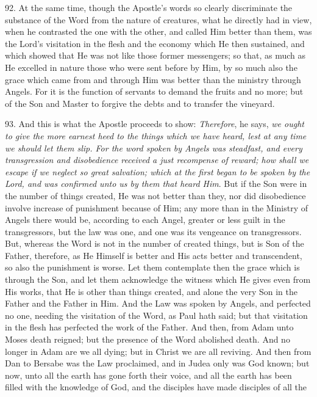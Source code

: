 92. At the same time, though
the Apostle's words so clearly discriminate the substance of the Word
from the nature of creatures, what he directly had in view, when he
contrasted the one with the other, and called Him better than them,
was the Lord's visitation in the flesh and the economy which He then
sustained, and which showed that He was not like those former
messengers; so that, as much as He excelled in nature those who were
sent before by Him, by so much also the grace which came from and
through Him was better than the ministry through Angels. For it is the
function of servants to demand the fruits and no more; but of the Son
and Master to forgive the debts and to transfer the vineyard.

93. And this is what the
Apostle proceeds to show: \emph{Therefore}, he says, \emph{we ought to
give the more earnest heed to the things which we have heard, lest at
any time we should let them slip. For the word spoken by Angels was
steadfast, and every transgression and disobedience received a just
recompense} \emph{of reward; how shall we escape if we neglect
so great salvation; which at the first began to be spoken by the Lord,
and was confirmed unto us by them that heard Him}. But if the Son
were in the number of things created, He was not better than they, nor
did disobedience involve increase of punishment because of Him; any
more than in the Ministry of Angels there would be, according to each
Angel, greater or less guilt in the transgressors, but the law was
one, and one was its vengeance on transgressors. But, whereas the Word
is not in the number of created things, but is Son of the Father,
therefore, as He Himself is better and His acts better and
transcendent, so also the punishment is worse. Let them contemplate
then the grace which is through the Son, and let them acknowledge the
witness which He gives even from His works, that He is other than
things created, and alone the very Son in the Father and the Father in
Him. And the Law was spoken by Angels, and perfected no one, needing
the visitation of the Word, as Paul hath said; but that visitation in
the flesh has perfected the work of the Father. And then, from Adam
unto Moses death reigned; but the presence of the Word abolished
death. And no longer in Adam are we all dying; but in Christ we are
all reviving. And then from Dan to Bersabe was the Law proclaimed, and
in Judea only was God known; but now, unto all the earth has gone
forth their voice, and all the earth has been filled with the
knowledge of God, and the disciples have made disciples of all the

